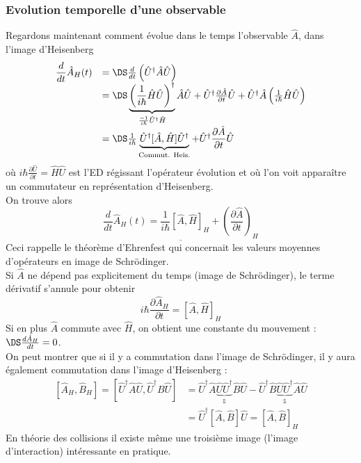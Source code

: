 \subsubsection{Evolution temporelle d'une observable}
 
Regardons maintenant comment évolue dans le temps l'observable $\hat{A}$, dans l'image 
d'Heisenberg
\begin{equation}
\begin{array}{ll}
\dfrac{d}{dt}\hat{A}_H(t) &= \DS \frac{d}{dt}\left(\hat{U}^\dagger \hat A \hat U\right)\\
&= \DS \underbrace{\left(\frac{1}{i\hbar}\hat{H}\hat{U}\right)^\dagger}_{\frac{-1}{i\hbar}\hat{U}^\dagger 
\hat{H}} \hat{A}\hat{U}+\hat{U}^\dagger 
\frac{\partial \hat{A}}{\partial t}\hat{U}+\hat{U}^\dagger\hat{A}\left(\frac{1}{i\hbar}\hat{H}
\hat{U}\right)\\
&=\DS \frac{1}{i\hbar}\underbrace{\hat{U}^\dagger[\hat{A},\hat{H}]\hat{U}^\dagger}_{\text{Commut. 
Heis.}} + \hat{U}^\dagger \dfrac{\partial\hat{A}}{\partial t}\hat{U}
\end{array}
\end{equation}
où $i\hbar\frac{\partial \hat{U}}{\partial t} = \hat{H}\hat{U}$ est l'ED régissant l'opérateur 
évolution et où l'on voit apparaître un commutateur en représentation d'Heisenberg.\\
On trouve alors
\begin{equation}
\underline{\dfrac{d}{dt}\hat{A}_H(t) = \dfrac{1}{i\hbar}[\hat{A},\hat{H}]_H + \left(\dfrac{\partial\hat{A}}{\partial 
t}\right)_H}
\end{equation}
Ceci rappelle le théorème d'Ehrenfest qui concernait les valeurs moyennes d'opérateurs en image de Schrödinger.\\
Si $\hat{A}$ ne dépend pas explicitement du temps (image de Schrödinger), le terme dérivatif s'annule pour obtenir
\begin{equation}
i\hbar \dfrac{\partial \hat{A}_H}{\partial t} = [\hat{A},\hat{H}]_H
\end{equation}
Si en plus $\hat{A}$ commute avec $\hat{H}$, on obtient une constante du mouvement : $\DS \frac{d\hat{A}_H}{
dt}=0$.\\
On peut montrer que si il y a commutation dans l'image de Schrödinger, il y aura également 
commutation dans l'image d'Heisenberg :
\begin{equation}
\begin{array}{ll}
[\hat{A}_H,\hat{B}_H] = [\hat{U}^\dagger\hat{A}\hat{U},\hat{U}^\dagger B\hat{U}] &= \hat{U}^\dagger\hat{A}
\underbrace{\hat{U}\hat{U}^\dagger}_{\mathbb{1}}\hat{B}\hat{U}-\hat{U}^\dagger\hat{B}\underbrace{\hat{U}
\hat{U}^\dagger}_{\mathbb{1}}\hat{A}\hat{U}\\
&= \hat{U}^\dagger[\hat{A},\hat{B}]\hat{U} = [\hat{A},\hat{B}]_H
\end{array}
\end{equation}
En théorie  des collisions il existe même une troisième image (l'image d'interaction) 
intéressante en pratique.

